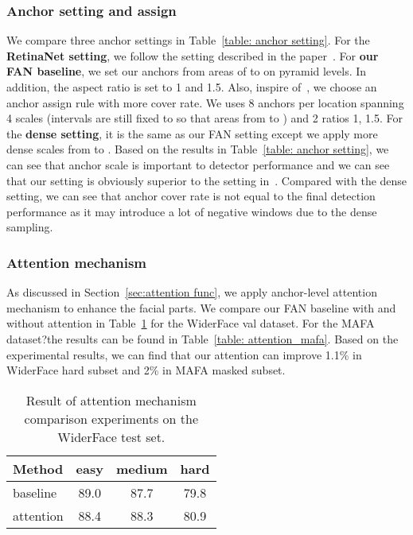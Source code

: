 \documentclass[10pt,twocolumn,letterpaper]{article}
\begin{document}
\subsubsection{Anchor setting and assign}

We compare three anchor settings in Table~\ref{table: anchor setting}. For the \textbf{RetinaNet setting}, we follow the setting described in the paper~\cite{lin2017focal}. For \textbf{our FAN baseline}, we set our anchors from areas of  to  on pyramid levels. In addition, the aspect ratio is set to 1 and 1.5. Also, inspire of~\cite{zhang2017s3fd}, we choose an anchor assign rule with more cover rate. We uses 8 anchors per location spanning 4 scales (intervals are still fixed to  so that areas from  to ) and 2 ratios {1, 1.5}.  For the \textbf{dense setting}, it is the same as our FAN setting except we apply more dense scales from  to . Based on the results in Table~\ref{table: anchor setting}, we can see that anchor scale is important to detector performance and we can see that our setting is obviously superior to the setting in~\cite{lin2017focal}. Compared with the dense setting, we can see that anchor cover rate is not equal to the final detection performance as it may introduce a lot of negative windows due to the dense sampling.


\subsubsection{Attention mechanism}
As discussed in Section~\ref{sec:attention func}, we apply anchor-level attention mechanism to enhance the facial parts. We compare our FAN baseline with and without attention in Table~\ref{table: attention_wider} for the WiderFace val dataset. For the MAFA dataset?the results can be found in Table~\ref{table: attention_mafa}. Based on the experimental results, we can find that our attention can improve 1.1\% in WiderFace hard subset and 2\% in MAFA masked subset.

\begin{table}[htbp]
\begin{center}
\begin{tabular}{|l|c|c|c|}
\hline
Method & easy & medium & hard \\
\hline
baseline & 89.0 & 87.7 & 79.8 \\
attention & 88.4 & 88.3 & 80.9 \\
\hline
\end{tabular}
\end{center}
\caption{Result of attention mechanism comparison experiments on the WiderFace test set.}
\label{table: attention_wider}
\end{table}
\end{document}
